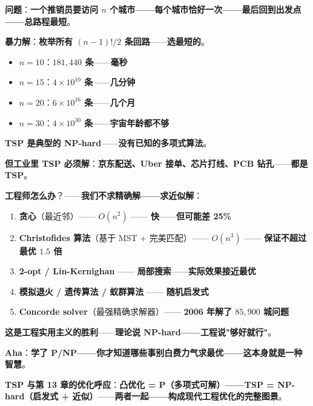 \begin{tcolorbox}[ahabox={\Large Aha：TSP 与 NP-complete 的边界}]
\textbf{问题}：\textbf{一个推销员要访问 $n$ 个城市——\textbf{每个城市恰好一次}——\textbf{最后回到出发点}——\textbf{总路程最短}}。

\medskip

\textbf{暴力解}：\textbf{枚举所有 $(n-1)!/2$ 条回路}——\textbf{选最短的}。

\begin{itemize}
\item $n = 10$：\textbf{$181{,}440$ 条}——\textbf{毫秒}
\item $n = 15$：\textbf{$4 \times 10^{10}$ 条}——\textbf{几分钟}
\item $n = 20$：\textbf{$6 \times 10^{16}$ 条}——\textbf{几个月}
\item $n = 30$：\textbf{$4 \times 10^{30}$ 条}——\textbf{\textbf{宇宙年龄都不够}}
\end{itemize}

\medskip

\textbf{TSP 是\textbf{典型的 NP-hard}}——\textbf{没有已知的多项式算法}。

\medskip

\textbf{但工业里 TSP 必须解}：\textbf{京东配送、Uber 接单、芯片打线、PCB 钻孔}——\textbf{都是 TSP}。

\medskip

\textbf{工程师怎么办}？——\textbf{我们不求精确解——\textbf{求近似解}}：

\begin{enumerate}
\item \textbf{贪心}（最近邻）—— $O(n^2)$ —— \textbf{快}——\textbf{但可能差 25\%}
\item \textbf{Christofides 算法}（基于 MST + 完美匹配）—— $O(n^3)$ —— \textbf{保证不超过最优 $1.5$ 倍}
\item \textbf{2-opt / Lin-Kernighan} —— \textbf{局部搜索}——\textbf{实际效果接近最优}
\item \textbf{模拟退火 / 遗传算法 / 蚁群算法} —— \textbf{随机启发式}
\item \textbf{Concorde solver}（最强精确求解器）—— \textbf{2006 年解了 $85{,}900$ 城问题}
\end{enumerate}

\medskip

\textbf{这是\textbf{工程实用主义的胜利}}——\textbf{理论说 NP-hard——\textbf{工程说"够好就行"}}。

\medskip

\textbf{Aha}：\textbf{学了 P/NP——\textbf{你才知道哪些事\textbf{别白费力气求最优}}——\textbf{这本身就是一种\textbf{智慧}}}。

\medskip

\textbf{TSP 与第 13 章的优化呼应}：\textbf{凸优化 = P（多项式可解）——\textbf{TSP = NP-hard（启发式 + 近似）}}——\textbf{两者一起——\textbf{构成现代工程优化的完整图景}}。
\end{tcolorbox}

